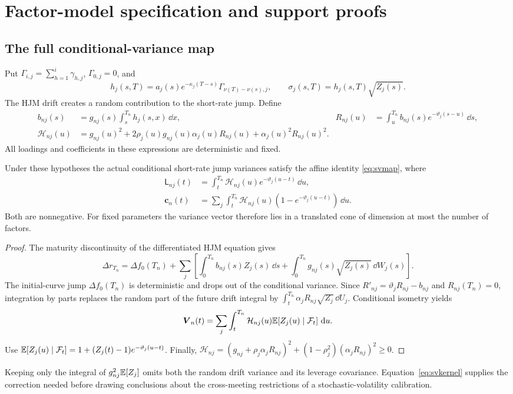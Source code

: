 \section{Factor-model specification and support proofs}\label{app:support}
\subsection{The full conditional-variance map}\label{app:svderivation}
Put $\Gamma_{i,j}=\sum_{h=1}^i\gamma_{h,j}$, $\Gamma_{0,j}=0$, and
\[
h_j(s,T)=a_j(s)e^{-\kappa_j(T-s)}\Gamma_{\nu(T)-\nu(s),j},
\qquad \sigma_j(s,T)=h_j(s,T)\sqrt{Z_j(s)}.
\]
The HJM drift creates a random contribution to the short-rate jump. Define
\begin{align}
b_{nj}(s)&=g_{nj}(s)\int_s^{T_n}h_j(s,x)\,\dd x,&
R_{nj}(u)&=\int_u^{T_n}b_{nj}(s)e^{-\vartheta_j(s-u)}\,\dd s,\nonumber\\
\mathcal H_{nj}(u)&=g_{nj}(u)^2+2\rho_j(u)g_{nj}(u)\alpha_j(u)R_{nj}(u)
                         +\alpha_j(u)^2R_{nj}(u)^2.\label{eq:svkernel}
\end{align}
All loadings and coefficients in these expressions are deterministic and fixed.

\begin{proposition}\label{prop:svmap}
Under these hypotheses the actual conditional short-rate jump variances satisfy
the affine identity \eqref{eq:svmap},
where
\begin{align*}
\mathsf L_{nj}(t)&=\int_t^{T_n}\mathcal H_{nj}(u)e^{-\vartheta_j(u-t)}\,\dd u,\\
\boldsymbol c_n(t)&=\sum_j\int_t^{T_n}\mathcal H_{nj}(u)(1-e^{-\vartheta_j(u-t)})\,\dd u.
\end{align*}
Both are nonnegative. For fixed parameters the variance vector therefore lies in a translated cone of dimension at most the number of factors.
\end{proposition}
\begin{proof}
The maturity discontinuity of the differentiated HJM equation gives
\[
\Delta r_{T_n}=\Delta f_0(T_n)+\sum_j\left[\int_0^{T_n}b_{nj}(s)Z_j(s)\,\dd s
                  +\int_0^{T_n}g_{nj}(s)\sqrt{Z_j(s)}\,\dd W_j(s)\right].
\]
The initial-curve jump $\Delta f_0(T_n)$ is deterministic and drops out of the conditional variance. Since $R'_{nj}=\vartheta_jR_{nj}-b_{nj}$ and $R_{nj}(T_n)=0$, integration by parts replaces the random part of the future drift integral by $\int_t^{T_n}\alpha_jR_{nj}\sqrt{Z_j}\,\dd U_j$. Conditional isometry yields
\[
\boldsymbol V_n(t)=\sum_j\int_t^{T_n}\mathcal H_{nj}(u)
                      \mathbb E[Z_j(u)\mid\mathcal F_t]\,\,\mathrm d u.
\]
Use $\mathbb E[Z_j(u)\mid\mathcal F_t]=1+(Z_j(t)-1)e^{-\vartheta_j(u-t)}$. Finally,
$\mathcal H_{nj}=(g_{nj}+\rho_j\alpha_jR_{nj})^2+(1-\rho_j^2)(\alpha_jR_{nj})^2\geq0$.
\end{proof}
Keeping only the integral of $g_{nj}^2\mathbb E[Z_j]$ omits both the random drift variance and its leverage covariance. Equation~\eqref{eq:svkernel} supplies the correction needed before drawing conclusions about the cross-meeting restrictions of a stochastic-volatility calibration.


